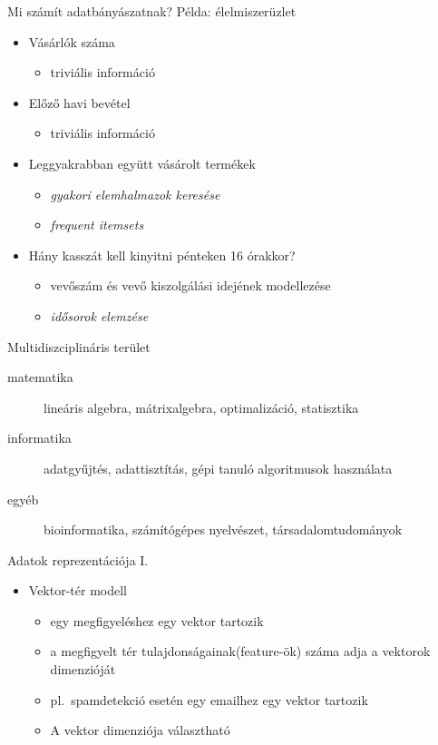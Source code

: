 \documentclass[bigger]{beamer}
\begin{document}
\begin{frame}{Mi számít adatbányászatnak?}
    Példa: élelmiszerüzlet
    \begin{itemize}
        \item Vásárlók száma
            \begin{itemize}
                \item triviális információ
            \end{itemize}
        \item Előző havi bevétel
            \begin{itemize}
                \item triviális információ
            \end{itemize}
        \item Leggyakrabban együtt vásárolt termékek
            \begin{itemize}
                \item \emph{gyakori elemhalmazok keresése}
                \item \emph{frequent itemsets}
            \end{itemize}
        \item Hány kasszát kell kinyitni pénteken 16 órakkor?
            \begin{itemize}
                \item vevőszám és vevő kiszolgálási idejének modellezése
                \item \emph{idősorok elemzése}
            \end{itemize}
    \end{itemize}
\end{frame}

\begin{frame}{Multidiszciplináris terület}
    \begin{description}
        \item[matematika] lineáris algebra, mátrixalgebra, optimalizáció, statisztika
        \item[informatika] adatgyűjtés, adattisztítás, gépi tanuló algoritmusok használata
        \item[egyéb] bioinformatika, számítógépes nyelvészet, társadalomtudományok
    \end{description}
\end{frame}

\begin{frame}{Adatok reprezentációja I.}
    \begin{itemize}
        \item Vektor-tér modell
            \begin{itemize}
                \item egy megfigyeléshez egy vektor tartozik
                \item a megfigyelt tér tulajdonságainak(feature-ök) száma adja a vektorok dimenzióját
                \item pl.~spamdetekció esetén egy emailhez egy vektor tartozik
                \item A vektor dimenziója választható
            \end{itemize}
    \end{itemize}
\end{frame}
\end{document}
